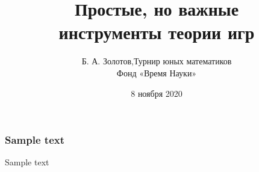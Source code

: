 \documentclass[aspectratio=1610,12pt,notheorems]{beamer}
\title[Introduction to Game Theory]
    {\bfseries Простые, но важные \\ инструменты теории игр}
\author[\ ]
	{Б. А. Золотов,\quad Турнир юных математиков\\ \vspace{0.3cm}
		{\small Фонд «Время Науки»}}
\institute[\ ]{\ }
\date{8 ноября 2020}
\begin{document}
\frame{\titlepage}

\begin{frame} \frametitle{Sample text}
Sample text
\end{frame}
\end{document}
